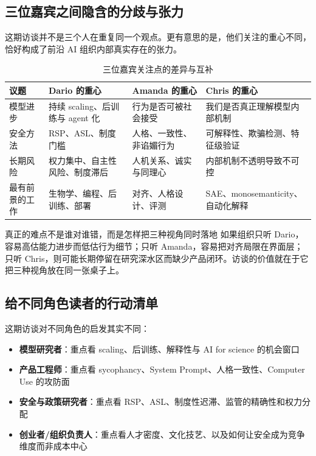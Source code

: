 \subsection{三位嘉宾之间隐含的分歧与张力}

这期访谈并不是三个人在重复同一个观点。更有意思的是，他们关注的重心不同，恰好构成了前沿 AI 组织内部真实存在的张力。

\begin{table}[H]
\centering
\begin{tabular}{p{} p{} p{} p{}}
\toprule
议题 & Dario 的重心 & Amanda 的重心 & Chris 的重心 \\
\midrule
模型进步 & 持续 scaling、后训练与 agent 化 & 行为是否可被社会接受 & 我们是否真正理解模型内部机制 \\
安全方法 & RSP、ASL、制度门槛 & 人格、一致性、非谄媚行为 & 可解释性、欺骗检测、特征级验证 \\
长期风险 & 权力集中、自主性风险、制度滞后 & 人机关系、诚实与同理心 & 内部机制不透明导致不可控 \\
最有前景的工作 & 生物学、编程、后训练、部署 & 对齐、人格设计、评测 & SAE、monosemanticity、自动化解释 \\
\bottomrule
\end{tabular}
\caption{三位嘉宾关注点的差异与互补}
\end{table}

\begin{knowledgebox}{真正的难点不是谁对谁错，而是怎样把三种视角同时落地}
如果组织只听 Dario，容易高估能力进步而低估行为细节；只听 Amanda，容易把对齐局限在界面层；只听 Chris，则可能长期停留在研究深水区而缺少产品闭环。访谈的价值就在于它把三种视角放在同一张桌子上。
\end{knowledgebox}

\subsection{给不同角色读者的行动清单}

这期访谈对不同角色的启发其实不同：

\begin{itemize}
    \item \textbf{模型研究者}：重点看 scaling、后训练、解释性与 AI for science 的机会窗口
    \item \textbf{产品工程师}：重点看 sycophancy、System Prompt、人格一致性、Computer Use 的攻防面
    \item \textbf{安全与政策研究者}：重点看 RSP、ASL、制度性迟滞、监管的精确性和权力分配
    \item \textbf{创业者/组织负责人}：重点看人才密度、文化技艺、以及如何让安全成为竞争维度而非成本中心
\end{itemize}

